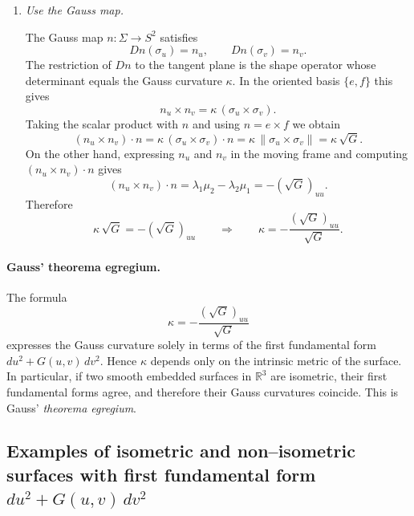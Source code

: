 \documentclass[12pt,a4paper]{article}
\theoremstyle{plain}
\theoremstyle{definition}      %
\begin{document}
\begin{enumerate}
		Since $\beta = e_v\cdot f$, we have
		\[
		\beta_u = (e_v\cdot f)_u
		= e_{vu}\cdot f + e_v\cdot f_u.
		\]
		Using the equality $e_{uv}=e_{vu}$ together with the frame formulas and
		collecting coefficients in the orthonormal basis yields
		\[
		\beta_u = \lambda_2\mu_1-\lambda_1\mu_2
		= -(\lambda_1\mu_2-\lambda_2\mu_1).
		\]
		Thus
		\[
		\lambda_1\mu_2-\lambda_2\mu_1
		= e_u\cdot f_v - f_u\cdot e_v
		= -\beta_u.
		\]
		Since $\beta=(\sqrt{G})_u$, it follows that
		\[
		-\beta_u = -(\sqrt{G})_{uu}.
		\]
		
		\item \emph{Use the Gauss map.}
		
		The Gauss map $n:\Sigma\to S^2$ satisfies
		\[
		Dn(\sigma_u) = n_u,\qquad Dn(\sigma_v) = n_v.
		\]
		The restriction of $Dn$ to the tangent plane is the shape operator whose
		determinant equals the Gauss curvature $\kappa$. In the oriented basis
		$\{e,f\}$ this gives
		\[
		n_u\times n_v = \kappa\,(\sigma_u\times\sigma_v).
		\]
		Taking the scalar product with $n$ and using $n=e\times f$ we obtain
		\[
		(n_u\times n_v)\cdot n
		= \kappa\,(\sigma_u\times\sigma_v)\cdot n
		= \kappa\,\|\sigma_u\times\sigma_v\|
		= \kappa\,\sqrt{G}.
		\]
		On the other hand, expressing $n_u$ and $n_v$ in the moving frame and
		computing $(n_u\times n_v)\cdot n$ gives
		\[
		(n_u\times n_v)\cdot n = \lambda_1\mu_2-\lambda_2\mu_1
		= -(\sqrt{G})_{uu}.
		\]
		Therefore
		\[
		\boxed{\kappa\,\sqrt{G} = -(\sqrt{G})_{uu}}
		\qquad\Longrightarrow\qquad
		\boxed{\kappa = -\dfrac{(\sqrt{G})_{uu}}{\sqrt{G}}}.
		\]
		
	\end{enumerate}
	
	\paragraph{Gauss' theorema egregium.}
	
	The formula
	\[
	\kappa = -\frac{(\sqrt{G})_{uu}}{\sqrt{G}}
	\]
	expresses the Gauss curvature solely in terms of the first fundamental form
	$du^2+G(u,v)\,dv^2$. Hence $\kappa$ depends only on the intrinsic metric of the
	surface. In particular, if two smooth embedded surfaces in $\mathbb{R}^3$
	are isometric, their first fundamental forms agree, and therefore their Gauss
	curvatures coincide. This is Gauss' \emph{theorema egregium}.
	
\subsection*{Examples of isometric and non--isometric surfaces
	with first fundamental form $du^{2}+G(u,v)\,dv^{2}$}
\end{document}
